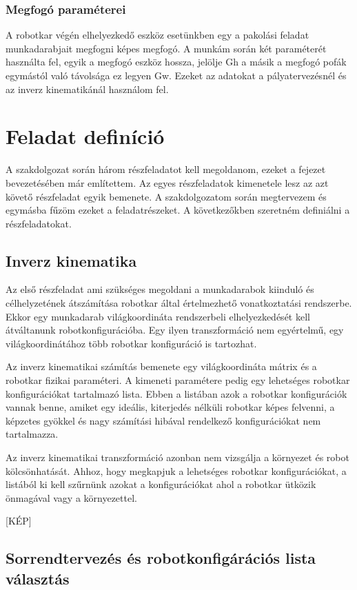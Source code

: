 \subsubsection{Megfogó paraméterei}

A robotkar végén elhelyezkedő eszköz esetünkben egy a pakolási feladat munkadarabjait megfogni képes megfogó. A munkám során két paraméterét használta fel, egyik a megfogó eszköz hossza, jelölje Gh a másik a megfogó pofák egymástól való távolsága ez legyen Gw. Ezeket az adatokat a pályatervezésnél és az inverz kinematikánál használom fel.

\section{Feladat definíció}

A szakdolgozat során három részfeladatot kell megoldanom, ezeket a fejezet bevezetésében már említettem. Az egyes részfeladatok kimenetele lesz az azt követő részfeladat egyik bemenete. A szakdolgozatom során megtervezem és egymásba fűzöm ezeket a feladatrészeket. A következőkben szeretném definiálni a részfeladatokat. 

\subsection{Inverz kinematika}
Az első részfeladat ami szükséges megoldani a munkadarabok kiinduló és célhelyzetének átszámítása robotkar által értelmezhető vonatkoztatási rendszerbe. Ekkor egy munkadarab világkoordináta rendszerbeli elhelyezkedését kell átváltanunk robotkonfigurációba. Egy ilyen transzformáció nem egyértelmű, egy világkoordinátához több robotkar konfiguráció is tartozhat.

Az inverz kinematikai számítás bemenete egy világkoordináta mátrix és a robotkar fizikai paraméteri. A kimeneti paramétere pedig egy lehetséges robotkar konfigurációkat tartalmazó lista. Ebben a listában azok a robotkar konfigurációk vannak benne, amiket egy ideális, kiterjedés nélküli robotkar képes felvenni, a képzetes gyökkel és nagy számítási hibával rendelkező konfigurációkat nem tartalmazza.

Az inverz kinematikai transzformáció azonban nem vizsgálja a környezet és robot kölcsönhatását. Ahhoz, hogy megkapjuk a lehetséges robotkar konfigurációkat, a listából ki kell szűrnünk azokat a konfigurációkat ahol a robotkar ütközik önmagával vagy a környezettel.

[KÉP]
\subsection{Sorrendtervezés és robotkonfigárációs lista választás}

